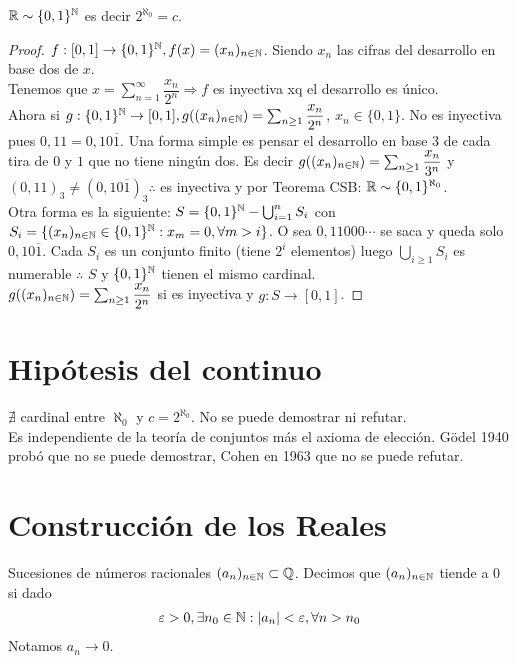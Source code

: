 \begin{theorem}
  $\mathbb{R} \sim \{ 0, 1 \}^{\mathbb{N}}$ es decir $2^{\aleph_0} = c$.
  \begin{proof}
    $f: [0, 1] \to \{ 0, 1 \}^{\mathbb{N}}, f(x) = (x_n)_{n \in \mathbb{N}}$. Siendo $x_n$ las cifras del desarrollo en base dos de $x$. \\
    Tenemos que $x = \sum_{n=1}^\infty \dfrac{x_n}{2^n} \Rightarrow f$ es inyectiva xq el desarrollo es único. \\
    Ahora si $g: \{ 0, 1 \}^{\mathbb{N}} \to [0, 1], g((x_n)_{n \in \mathbb{N}}) = \sum_{n \geq 1} \dfrac{x_n}{2^n}$, $x_n \in \{0, 1\}$. No es inyectiva pues $0,11 = 0,10\overline{1}$.
    Una forma simple es pensar el desarrollo en base $3$ de cada tira de $0$ y $1$ que no tiene ningún dos. Es decir $g((x_n)_{n \in \mathbb{N}}) = \sum_{n \geq 1} \dfrac{x_n}{3^n}$ y $(0,11)_3 \neq (0,10\overline{1})_3 \therefore$
    es inyectiva y por Teorema CSB: $\mathbb{R} \sim \{0,1\}^{\aleph_0}$. \\
    Otra forma es la siguiente:
    $S = \{0, 1\}^{\mathbb{N}} - \bigcup_{i=1}^n S_i$ con $S_i = \{ (x_n)_{n \in \mathbb{N}} \in \{0, 1\}^{\mathbb{N}} : x_m = 0, \forall m > i \}$. O sea $0,11000\cdots$ se saca y queda solo $0,10\overline{1}$.
    Cada $S_i$ es un conjunto finito (tiene $2^i$ elementos) luego $\bigcup_{i \geq 1} S_i$ es numerable $\therefore$ $S$ y $\{0,1\}^{\mathbb{N}}$ tienen el mismo cardinal. \\
    $g((x_n)_{n \in \mathbb{N}}) = \sum_{n \geq 1} \dfrac{x_n}{2^n}$ si es inyectiva y $g: S \to [0, 1]$.
  \end{proof}
\end{theorem}

\section{Hipótesis del continuo}

$\nexists$ cardinal entre $\aleph_0$ y $c = 2^{\aleph_0}$. No se puede demostrar ni refutar. \\
Es independiente de la teoría de conjuntos más el axioma de elección.
Gödel 1940 probó que no se puede demostrar, Cohen en 1963 que no se puede refutar.

\section{Construcción de los Reales}

Sucesiones de números racionales $(a_n)_{n \in \mathbb{N}} \subset \mathbb{Q}$. Decimos que $(a_n)_{n \in \mathbb{N}}$ tiende a 0 si dado \begin{align*} \varepsilon > 0, \exists n_0 \in \mathbb{N} : |a_n| < \varepsilon, \forall n > n_0 \end{align*} Notamos $a_n \to 0$.

